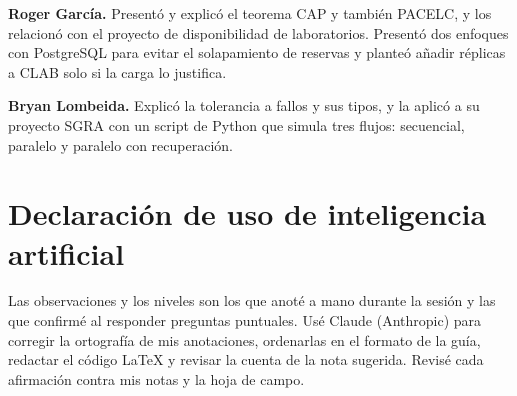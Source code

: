 \documentclass[11pt,a4paper]{article}
\begin{document}
\textbf{Roger García.} Presentó y explicó el teorema CAP y también PACELC, y los relacionó con el proyecto de disponibilidad de laboratorios. Presentó dos enfoques con PostgreSQL para evitar el solapamiento de reservas y planteó añadir réplicas a CLAB solo si la carga lo justifica.

\textbf{Bryan Lombeida.} Explicó la tolerancia a fallos y sus tipos, y la aplicó a su proyecto SGRA con un script de Python que simula tres flujos: secuencial, paralelo y paralelo con recuperación.

\section*{Declaración de uso de inteligencia artificial}
Las observaciones y los niveles son los que anoté a mano durante la sesión y las que confirmé al responder preguntas puntuales. Usé Claude (Anthropic) para corregir la ortografía de mis anotaciones, ordenarlas en el formato de la guía, redactar el código \LaTeX{} y revisar la cuenta de la nota sugerida. Revisé cada afirmación contra mis notas y la hoja de campo.
\end{document}

